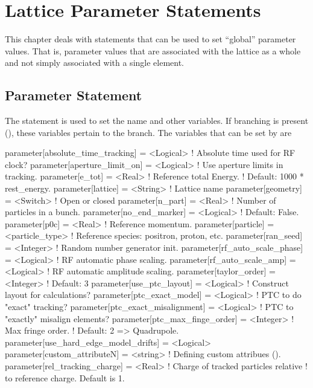 \chapter{Lattice Parameter Statements}

This chapter deals with statements that can be used to set ``global''
parameter values. That is, parameter values that are associated with
the lattice as a whole and not simply associated with a single element.

\section{Parameter Statement}
\label{s:param}


The  statement is used to set the  name and
other variables. If branching is present (), these
variables pertain to the  branch. The variables that can be
set by  are
\begin{example}
  parameter[absolute_time_tracking] = <Logical>  ! Absolute time used for RF clock?
  parameter[aperture_limit_on]      = <Logical>  ! Use aperture limits in tracking.
  parameter[e_tot]         = <Real>          ! Reference total Energy. 
                                             !      Default: 1000 * rest_energy.
  parameter[lattice]       = <String>        ! Lattice name 
  parameter[geometry]      = <Switch>        ! Open or closed
  parameter[n_part]        = <Real>          ! Number of particles in a bunch.
  parameter[no_end_marker] = <Logical>       ! Default: False.
  parameter[p0c]           = <Real>          ! Reference momentum.
  parameter[particle]      = <particle_type> ! Reference species: positron, proton, etc.
  parameter[ran_seed]      = <Integer>       ! Random number generator init.
  parameter[rf_auto_scale_phase]    = <Logical>  ! RF automatic phase scaling.
  parameter[rf_auto_scale_amp]      = <Logical>  ! RF automatic amplitude scaling.
  parameter[taylor_order]           = <Integer>  ! Default: 3
  parameter[use_ptc_layout]         = <Logical>  ! Construct layout for calculations?
  parameter[ptc_exact_model]        = <Logical>  ! PTC to do "exact" tracking?
  parameter[ptc_exact_misalignment] = <Logical>  ! PTC to "exactly" misalign elements?
  parameter[ptc_max_finge_order]    = <Integer>  ! Max fringe order. 
                                                 !    Default: 2 => Quadrupole.
  parameter[use_hard_edge_model_drifts] = <Logical>
  parameter[custom_attributeN]      = <string>   ! Defining custom attribues ().
  parameter[rel_tracking_charge]    = <Real>     ! Charge of tracked particles relative 
                                                 !   to reference charge. Default is 1.
\end{example}

